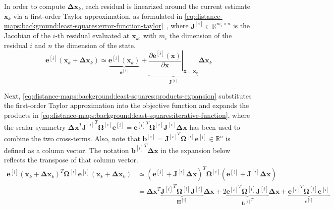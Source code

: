 In order to compute $\mathbf{\Delta x}_k$,
each residual is linearized around the current estimate $\mathbf{x}_k$
via a first-order Taylor approximation, as formulated in
\eqref{eq:distance-maps:background:least-squares:error-function-taylor}~\cite{barfoot:book:2017,nocedal-wright:book:2006},
where $\mathbf{J}^{[i]}\in\mathbb{R}^{m_i\times n}$ is the Jacobian of the
$i$-th residual evaluated at $\mathbf{x}_k$, with $m_i$ the dimension of the
residual $i$ and $n$ the dimension of the state.
\begin{equation}
\label{eq:distance-maps:background:least-squares:error-function-taylor}
\mathbf{e}^{[i]}\!\left(\mathbf{x}_k + \mathbf{\Delta x}_k\right)
\simeq
\underbrace{\mathbf{e}^{[i]}\!\left(\mathbf{x}_k\right)}_{\mathbf{e}^{[i]}} +
\underbrace{\left.\frac{\partial \mathbf{e}^{[i]}\!\left(\mathbf{x}\right)}{\partial \mathbf{x}}
\right|_{\mathbf{x}=\mathbf{x}_k}}_{\mathbf{J}^{[i]}}
\mathbf{\Delta x}_k
\end{equation}

Next, \eqref{eq:distance-maps:background:least-squares:products-expansion}
substitutes the first-order Taylor approximation into the objective function and
expands the products in
\eqref{eq:distance-maps:background:least-squares:iterative-function},
where the scalar symmetry
$\mathbf{\Delta x}^T {\mathbf{J}^{[i]}}^T \mathbf{\Omega}^{[i]}
\mathbf{e}^{[i]} = {\mathbf{e}^{[i]}}^T \mathbf{\Omega}^{[i]}
\mathbf{J}^{[i]} \mathbf{\Delta x}$ has been used to combine the two
cross-terms. Also, note that $\mathbf{b}^{[i]} = {\mathbf{J}^{[i]}}^T
\mathbf{\Omega}^{[i]} \mathbf{e}^{[i]} \in \mathbb{R}^{n}$ is defined as
a column vector. The notation ${\mathbf{b}^{[i]}}^T \mathbf{\Delta x}$ in
the expansion below reflects the transpose of that column vector.
\begin{equation}
\label{eq:distance-maps:background:least-squares:products-expansion}
\begin{aligned}
\mathbf{e}^{[i]}\!\left(\mathbf{x}_k + \mathbf{\Delta x}_k\right)^T
\mathbf{\Omega}^{[i]}
\mathbf{e}^{[i]}\!\left(\mathbf{x}_k + \mathbf{\Delta x}_k\right)
& \simeq \left(\mathbf{e}^{[i]} + \mathbf{J}^{[i]} \mathbf{\Delta x}\right)^T
         \mathbf{\Omega}^{[i]}
         \left(\mathbf{e}^{[i]} + \mathbf{J}^{[i]} \mathbf{\Delta x}\right)\\
& = \mathbf{\Delta x}^T \underbrace{{\mathbf{J}^{[i]}}^T \mathbf{\Omega}^{[i]} \mathbf{J}^{[i]}}_{\mathbf{H}^{[i]}} \mathbf{\Delta x} +
    2 \underbrace{{\mathbf{e}^{[i]}}^T \mathbf{\Omega}^{[i]} \mathbf{J}^{[i]}}_{{\mathbf{b}^{[i]}}^T} \mathbf{\Delta x} +
    \underbrace{{\mathbf{e}^{[i]}}^T \mathbf{\Omega}^{[i]} \mathbf{e}^{[i]}}_{c^{[i]}}
\end{aligned}
\end{equation}

